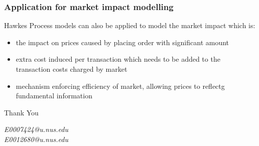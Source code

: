 \documentclass{beamer}
\begin{document}
\begin{frame}
\frametitle{Application for market impact modelling}
Hawkes Process models can also be applied to model the market impact which is:
\begin{itemize}
	\item the impact on prices caused by placing order with significant amount
	\item extra cost induced per transaction which needs to be added to the transaction costs charged by market
	\item mechanism enforcing efficiency of market, allowing prices to reflectg fundamental information
\end{itemize}
\end{frame}

\begin{frame}
\Huge{\centerline{Thank You}}
\begin{center}
\end{center}
\begin{center}
\begin{normalsize}
\emph{E0007424@u.nus.edu}\\
\emph{E0012680@u.nus.edu}
\end{normalsize}
\end{center}
\end{frame}


\end{document}
